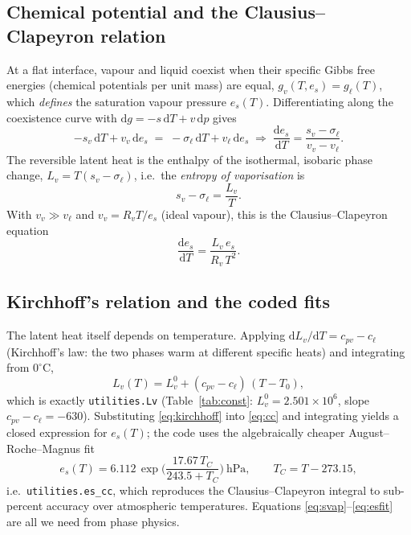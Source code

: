 \documentclass[11pt,a4paper]{article}
\theoremstyle{definition}
\newcommand{\Rv}{R_v}
\newcommand{\cpv}{c_{pv}}
\newcommand{\cl}{c_\ell}
\newcommand{\Lv}{L_v}
\newcommand{\es}{e_s}
\newcommand{\dd}{\mathrm{d}}
\begin{document}
\subsection{Chemical potential and the Clausius--Clapeyron relation}

At a flat interface, vapour and liquid coexist when their specific Gibbs free
energies (chemical potentials per unit mass) are equal, $g_v(T,\es)=g_\ell(T)$,
which \emph{defines} the saturation vapour pressure $\es(T)$. Differentiating
along the coexistence curve with $\dd g=-s\,\dd T+v\,\dd p$ gives
\begin{equation}
-s_v\,\dd T + v_v\,\dd\es \;=\; -\sigma_\ell\,\dd T + v_\ell\,\dd\es
\;\Longrightarrow\;
\frac{\dd\es}{\dd T}=\frac{s_v-\sigma_\ell}{v_v-v_\ell}.
\end{equation}
The reversible latent heat is the enthalpy of the isothermal, isobaric phase
change, $\Lv=T(s_v-\sigma_\ell)$, i.e.\ the \emph{entropy of vaporisation} is
\begin{equation}\label{eq:svap}
s_v-\sigma_\ell=\frac{\Lv}{T}.
\end{equation}
With $v_v\gg v_\ell$ and $v_v=\Rv T/\es$ (ideal vapour), this is the
Clausius--Clapeyron equation
\begin{equation}\label{eq:cc}
\frac{\dd\es}{\dd T}=\frac{\Lv\,\es}{\Rv\,T^{2}}.
\end{equation}

\subsection{Kirchhoff's relation and the coded fits}

The latent heat itself depends on temperature. Applying
$\dd\Lv/\dd T=\cpv-\cl$ (Kirchhoff's law: the two phases warm at different
specific heats) and integrating from $0^{\circ}$C,
\begin{equation}\label{eq:kirchhoff}
\Lv(T)=\Lv^{0}+(\cpv-\cl)\,(T-T_0),
\end{equation}
which is exactly \texttt{utilities.Lv} (Table~\ref{tab:const}:
$\Lv^0=2.501\times10^6$, slope $\cpv-\cl=-630$). Substituting
\eqref{eq:kirchhoff} into \eqref{eq:cc} and integrating yields a closed
expression for $\es(T)$; the code uses the algebraically cheaper
August--Roche--Magnus fit
\begin{equation}\label{eq:esfit}
\es(T)=6.112\,\exp\!\Big(\frac{17.67\,T_C}{243.5+T_C}\Big)\ \mathrm{hPa},
\qquad T_C=T-273.15,
\end{equation}
i.e.\ \texttt{utilities.es\_cc}, which reproduces the Clausius--Clapeyron
integral to sub-percent accuracy over atmospheric temperatures. Equations
\eqref{eq:svap}--\eqref{eq:esfit} are all we need from phase physics.
\end{document}
